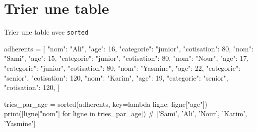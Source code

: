 \section{Trier une table}


\begin{codereference}{Trier une table avec \lstinline{sorted}}
\begin{python}
adherents = [
    {"nom": "Ali", "age": 16, "categorie": "junior", "cotisation": 80},
    {"nom": "Sami", "age": 15, "categorie": "junior", "cotisation": 80},
    {"nom": "Nour", "age": 17, "categorie": "junior", "cotisation": 80},
    {"nom": "Yasmine", "age": 22, "categorie": "senior", "cotisation": 120},
    {"nom": "Karim", "age": 19, "categorie": "senior", "cotisation": 120},
]

tries_par_age = sorted(adherents, key=lambda ligne: ligne["age"])
print([ligne["nom"] for ligne in tries_par_age])
# ['Sami', 'Ali', 'Nour', 'Karim', 'Yasmine']
\end{python}
\end{codereference}





